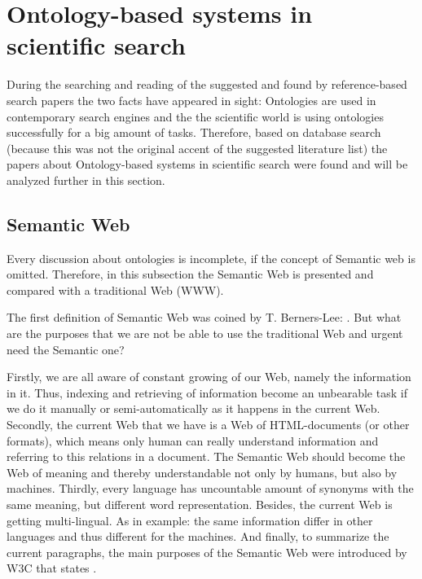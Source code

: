 \section{Ontology-based systems in scientific search}
During the searching and reading of the suggested and found by reference-based search papers the two facts have appeared in sight: Ontologies are used in contemporary search engines and the the scientific world is using ontologies successfully for a big amount of tasks. Therefore, based on database search (because this was not the original accent of the suggested literature list) the papers about Ontology-based systems in scientific search were found and will be analyzed further in this section.
		\subsection{Semantic Web}
		\label{sec:SemWeb}
		Every discussion about ontologies is incomplete, if the concept of Semantic web is omitted. Therefore, in this subsection the Semantic Web is presented and compared with a traditional Web (WWW).
		
		The first definition of Semantic Web was coined by T. Berners-Lee: \frqq\cite{Ber01}. But what are the purposes that we are not be able to use the traditional Web and urgent need the Semantic one? 
		
		Firstly, we are all aware of constant growing of our Web, namely the information in it. Thus, indexing and retrieving of information become an unbearable task if we do it manually or semi-automatically as it happens in the current Web. Secondly, the current Web that we have is a Web of HTML-documents (or other formats), which means only human can really understand information and referring to this relations in a document. The Semantic Web should become the Web of meaning and thereby understandable not only by humans, but also by machines. Thirdly, every language has uncountable amount of synonyms with the same meaning, but different word representation. Besides, the current Web is getting multi-lingual. As in example: \frqq \cite[p. 40 ]{Raj14} the same information differ in other languages and thus different for the machines. And finally, to summarize the current paragraphs, the main purposes of the Semantic Web were introduced by W3C that states \frqq\cite{w3c01}.
		
